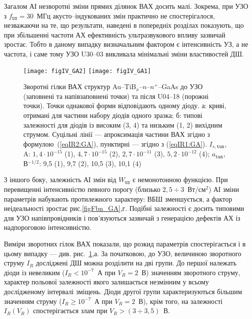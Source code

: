 Загалом АІ незворотні зміни прямих ділянок ВАХ досить малі.
Зокрема, при УЗО з $f_\mathtt{US}=30$~МГц акусто--індукованих змін практично не спостерігалося,
незважаючи на те, що результати, наведені в попередніх розділах показують, що при збільшенні частоти АХ
ефективність ультразвукового впливу зазвичай зростає.
Тобто в даному випадку визначальним фактором є інтенсивність УЗ, а не частота, і саме тому УЗО U30--03
викликала мінімальні зміни властивостей ДШ.

\begin{figure}
\center
\texttt{[image: figIV\_GA2]} \hfill
\texttt{[image: figIV\_GA1]}
\caption{\label{figIV_GA}
Зворотні гілки ВАХ структур Au--TiB$_x$--$n$--$n^+$--GaAs
до УЗО (заповнені та напівзаповнені точки)
та після U04--18 (порожні точки).
Точки однакової форми відповідають одному діоду.
а: криві, отримані для частини набору діодів одного зразка;
б: типові залежності для діодів із високим (3, 4) та низьким (1, 2)
вихідним струмом.
Суцільні лінії --- апроксимація частини ВАХ згідно з формулою~(\ref{eqIR2:GA}),
пунктирні  --- згідно з (\ref{eqIR1:GA}).
$I_{s,\mathtt{tun}}$, A: $1,4\cdot10^{-15}$ (1), $4,7\cdot10^{-15}$ (2), $2,7\cdot10^{-11}$ (3), $5,2\cdot10^{-12}$ (4);
$a_\mathtt{tun}$, В$^{-1/2}$: 9,5 (1), 9,7 (2), 10,5 (3), 10,1 (4)
}%
\end{figure}

З іншого боку, залежність АІ змін від $W_\mathtt{US}$ є немонотонною функцією.
При перевищенні інтенсивністю певного порогу (близько $2,5\div3$~Вт/см$^2$) АІ зміни параметрів набувають
протилежного характеру:  ВБШ зменшується, а фактор неідеальності зростає рис.\ref{figFbn_GA},г.
Подібні залежності є досить типовими для УЗО напівпровідників \cite{Zdeb1989,Zaver,Zaver2005}
і пов'язуються зазвичай з генерацією дефектів АХ із надпороговою інтенсивністю.



Виміри зворотних гілок ВАХ показали, що розкид параметрів спостерігається і в цьому випадку ---
див. рис.~\ref{figIV_GA},а.
За початковою, до УЗО, величиною зворотного струму $I_R$ досліджені ДШ можна розділити на дві групи.
До першої належать діоди із невеликим ($I_R<10^{-7}$~А при $V_R=2$~В) значенням зворотного струму, характер польової залежності якого залишається незмінним у всьому дослідженому інтервалі зміщень.
Діоди другої групи характеризуються більшим значенням струму ($I_R\geq10^{-7}$~А при $V_R=2$~В), крім того, на залежності $I_R(V_R)$ спостерігається злам при $V_R>(3\div3,5)$~В.


